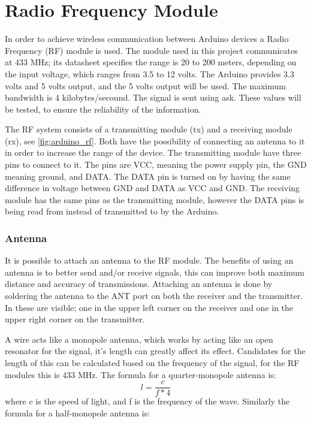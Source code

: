 \section{Radio Frequency Module} \label{rfmodule}
In order to achieve wireless communication between Arduino devices a Radio Frequency (RF) module is used.
The module used in this project communicates at 433 MHz; its datasheet specifies the range is 20 to 200 meters, depending on the input voltage, which ranges from 3.5 to 12 volts. 
The Arduino provides 3.3 volts and 5 volts output, and the 5 volts output will be used.
The maximum bandwidth is 4 kilobytes/secound. 
The signal is sent using \gls{ask}.
These values will be tested, to ensure the reliability of the information. 

The RF system consists of a transmitting module (tx) and a receiving module (rx), see \ref{fig:arduino_rf}.
Both have the possibility of connecting an antenna to it in order to increase the range of the device.
The transmitting module have three pins to connect to it.
The pins are VCC, meaning the power supply pin, the GND meaning ground, and DATA.
The DATA pin is turned on by having the same difference in voltage between GND and DATA as VCC and GND. 
The receiving module has the same pins as the transmitting module, however the DATA pins is being read from instead of transmitted to by the Arduino.


\subsubsection{Antenna}
It is possible to attach an antenna to the RF module. 
The benefits of using an antenna is to better send and/or receive signals, this can improve both maximum distance and accuracy of transmissions.
Attaching an antenna is done by soldering the antenna to the ANT port on both the receiver and the transmitter. 
In  these are visible; one in the upper left corner on the receiver and one in the upper right corner on the transmitter. 

A wire acts like a monopole antenna, which works by acting like an open resonator for the signal, it's length can greatly affect its effect. 
Candidates for the length of this can be calculated based on the frequency of the signal, for the RF modules this is 433 MHz.
The formula for a quarter-monopole antenna is: 
\begin{equation} \label{QMA}
l = \frac{c}{f * 4}
\end{equation}
where c is the speed of light, and f is the frequency of the wave.
Similarly the formula for a half-monopole antenna is: 

